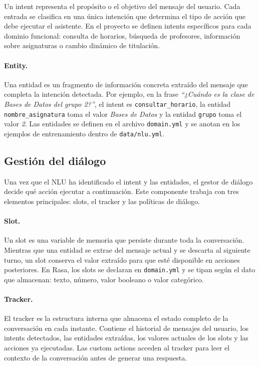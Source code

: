 Un intent representa el propósito o el objetivo del mensaje del usuario. Cada entrada se clasifica en una única intención que determina el tipo de acción que debe ejecutar el asistente. En el proyecto se definen intents específicos para cada dominio funcional: consulta de horarios, búsqueda de profesores, información sobre asignaturas o cambio dinámico de titulación.

\paragraph{Entity.}

Una entidad es un fragmento de información concreta extraído del mensaje que completa la intención detectada. Por ejemplo, en la frase \textit{``¿Cuándo es la clase de Bases de Datos del grupo 2?''}, el intent es \texttt{consultar\_horario}, la entidad \texttt{nombre\_asignatura} toma el valor \textit{Bases de Datos} y la entidad \texttt{grupo} toma el valor \textit{2}. Las entidades se definen en el archivo \texttt{domain.yml} y se anotan en los ejemplos de entrenamiento dentro de \texttt{data/nlu.yml}.

\subsection{Gestión del diálogo}

Una vez que el NLU ha identificado el intent y las entidades, el gestor de diálogo decide qué acción ejecutar a continuación. Este componente trabaja con tres elementos principales: slots, el tracker y las políticas de diálogo.

\paragraph{Slot.}

Un slot es una variable de memoria que persiste durante toda la conversación. Mientras que una entidad se extrae del mensaje actual y se descarta al siguiente turno, un slot conserva el valor extraído para que esté disponible en acciones posteriores. En Rasa, los slots se declaran en \texttt{domain.yml} y se tipan según el dato que almacenan: texto, número, valor booleano o valor categórico.

\paragraph{Tracker.}

El tracker es la estructura interna que almacena el estado completo de la conversación en cada instante. Contiene el historial de mensajes del usuario, los intents detectados, las entidades extraídas, los valores actuales de los slots y las acciones ya ejecutadas. Las custom actions acceden al tracker para leer el contexto de la conversación antes de generar una respuesta.

